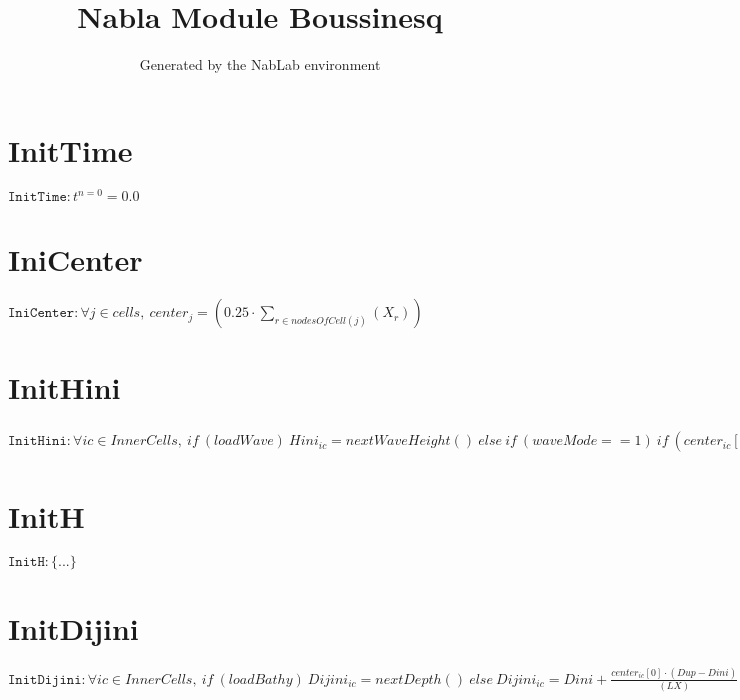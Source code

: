 \documentclass[11pt]{article}
\title{Nabla Module Boussinesq}
\author{Generated by the NabLab environment}
\begin{document}
\maketitle


\section{InitTime}
$\texttt{InitTime} : t^{n=0} = 0.0$


\section{IniCenter}
$\texttt{IniCenter} : \forall{j\in cells}, \ center_{j} = \left(0.25 \cdot \sum_{r\in nodesOfCell(j)}\left(X_{r}\right)\right)$


\section{InitHini}
$\texttt{InitHini} : \forall{ic\in InnerCells}, \ if~\left(loadWave\right)~Hini_{ic} = nextWaveHeight\left(\right)~else~if~\left(waveMode == 1\right)~if~\left(center_{ic}\left[0\right] < \left(\frac{X0}{2.0}\right)\right)~Hini_{ic} = Amp \cdot sin\left(center_{ic}\left[0\right] \cdot \left(\frac{2 \cdot 3.1415}{X0}\right)\right)~else~Hini_{ic} = 0.0~else~if~\left(waveMode == 2\right)~Hini_{ic} = Amp \cdot exp\left(\frac{-0.5 \cdot \left(center_{ic}\left[0\right] - X0\right) \cdot \left(center_{ic}\left[0\right] - X0\right)}{\left(Sigma \cdot Sigma\right)}\right) \cdot exp\left(\frac{-0.5 \cdot \left(center_{ic}\left[1\right] - Y0\right) \cdot \left(center_{ic}\left[1\right] - Y0\right)}{\left(Sigma \cdot Sigma\right)}\right)~else~if~\left(waveMode == 3\right)~Hini_{ic} = Amp \cdot exp\left(\frac{-0.5 \cdot \left(center_{ic}\left[0\right] - X0\right) \cdot \left(center_{ic}\left[0\right] - X0\right)}{\left(Sigma \cdot Sigma\right)}\right)$


\section{InitH}
$\texttt{InitH} : \{ ... \}$


\section{InitDijini}
$\texttt{InitDijini} : \forall{ic\in InnerCells}, \ if~\left(loadBathy\right)~Dijini_{ic} = nextDepth\left(\right)~else~Dijini_{ic} = Dini + \frac{center_{ic}\left[0\right] \cdot \left(Dup - Dini\right)}{\left(LX\right)}$
\end{document}
